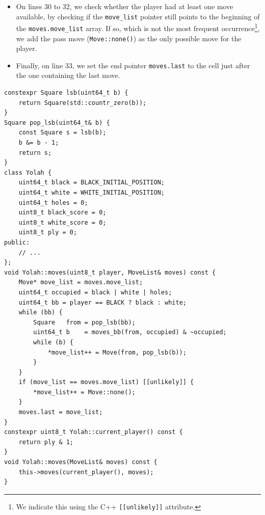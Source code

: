 \documentclass[12pt,a4paper,twoside,openright]{book}
\begin{document}
\begin{itemize}
\item On lines 30 to 32, we check whether the player had at least one move available, by checking if the \texttt{move_list} pointer still points to the beginning of the \texttt{moves.move_list} array. If so, which is not the most frequent occurrence\footnote{We indicate this using the C++ \texttt{[[unlikely]]} attribute.}, we add the pass move (\texttt{Move::none()}) as the only possible move for the player.

\item Finally, on line 33, we set the end pointer \texttt{moves.last} to the cell just after the one containing the last move.

\end{itemize}

\begin{mdframed}[skipabove=\baselineskip,hidealllines=true]
\begin{verbatim}
constexpr Square lsb(uint64_t b) {
    return Square(std::countr_zero(b));
}
Square pop_lsb(uint64_t& b) {
    const Square s = lsb(b);
    b &= b - 1;
    return s;
}
class Yolah {
    uint64_t black = BLACK_INITIAL_POSITION;
    uint64_t white = WHITE_INITIAL_POSITION;
    uint64_t holes = 0;
    uint8_t black_score = 0;
    uint8_t white_score = 0;
    uint8_t ply = 0;
public:
    // ...
};
void Yolah::moves(uint8_t player, MoveList& moves) const {
    Move* move_list = moves.move_list;
    uint64_t occupied = black | white | holes;
    uint64_t bb = player == BLACK ? black : white;
    while (bb) {
        Square   from = pop_lsb(bb);
        uint64_t b    = moves_bb(from, occupied) & ~occupied;
        while (b) {
            *move_list++ = Move(from, pop_lsb(b));
        }
    }
    if (move_list == moves.move_list) [[unlikely]] {
        *move_list++ = Move::none();
    }
    moves.last = move_list;
}
constexpr uint8_t Yolah::current_player() const {
    return ply & 1;
}
void Yolah::moves(MoveList& moves) const {
    this->moves(current_player(), moves);
}
\end{verbatim}
\label{lst:get_moves}
\end{mdframed}
\end{document}
